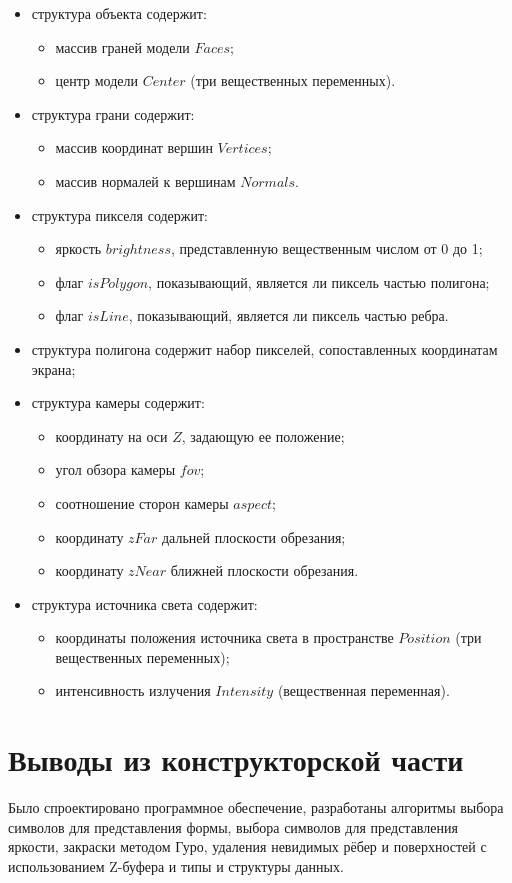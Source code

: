 \begin{itemize}
    \item структура объекта содержит:
    \begin{itemize}
        \item массив граней модели $Faces$;
        \item центр модели $Center$ (три вещественных переменных).
    \end{itemize}
    \item структура грани содержит:
    \begin{itemize}
        \item массив координат вершин $Vertices$;
        \item массив нормалей к вершинам $Normals$.
    \end{itemize}
    \item структура пикселя содержит:
    \begin{itemize}
        \item яркость $brightness$, представленную вещественным числом от 0 до 1;
        \item флаг $isPolygon$, показывающий, является ли пиксель частью полигона;
        \item флаг $isLine$, показывающий, является ли пиксель частью ребра.
    \end{itemize}
    \item структура полигона содержит набор пикселей, сопоставленных координатам экрана;
    \item структура камеры содержит:
    \begin{itemize}
        \item координату на оси $Z$, задающую ее положение;
        \item угол обзора камеры $fov$;
        \item соотношение сторон камеры $aspect$;
        \item координату $zFar$ дальней плоскости обрезания;
        \item координату $zNear$ ближней плоскости обрезания.
    \end{itemize}
    \item структура источника света содержит:
    \begin{itemize}
        \item координаты положения источника света в пространстве $Position$ (три вещественных переменных);
        \item интенсивность излучения $Intensity$ (вещественная переменная).
    \end{itemize}
\end{itemize}

\section{Выводы из конструкторской части}

Было спроектировано программное обеспечение, разработаны алгоритмы выбора символов для представления формы, выбора символов для представления яркости, закраски методом Гуро, удаления невидимых рёбер и поверхностей с использованием Z-буфера и типы и структуры данных.

\clearpage
